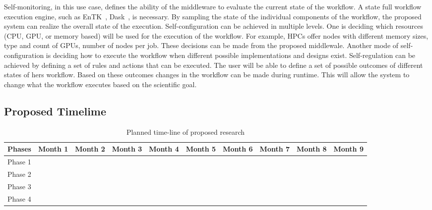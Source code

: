 Self-monitoring, in this use case, defines the ability of the middleware to evaluate the current state of the workflow. A state full workflow execution engine, such as EnTK~\cite{balasubramanian2018harnessing}, Dask~\cite{rocklin2015dask}, is necessary. By sampling the state of the individual components of the workflow, the proposed system can realize the overall state of the execution. Self-configuration can be achieved in multiple levels. One is deciding which resources (CPU, GPU, or memory based) will be used for the execution of the workflow. For example, HPCs offer nodes with different memory sizes, type and count of GPUs, number of nodes per job. These decisions can be made from the proposed middlewale. Another mode of self-configuration is deciding how to execute the workflow when different possible implementations and designs exist.  Self-regulation can be achieved by defining a set of rules and actions that can be executed. The user will be able to define a set of possible outcomes of different states of hers workflow. Based on these outcomes changes in the workflow can be made during runtime. This will allow the system to change what the workflow executes based on the scientific goal.

\subsection{Proposed Timelime}
\begin{table*}
	\centering
	\begin{tabular}{ |p{1.25cm}|p{1.25cm} p{1.25cm} p{1.25cm} p{1.25cm} p{1.25cm} p{1.25cm} p{1.25cm} p{1.25cm} p{1.25cm}|}
		\hline
		Phases  & Month 1 & Month 2 & Month 3 & Month 4 & Month 5 & Month 6 & Month 7 & Month 8 & Month 9 \\\hline\hline
		Phase 1 &         &         &         &         &         &         &         &         &         \\\hline
		Phase 2 &         &         &         &         &         &         &         &         &         \\\hline
		Phase 3 &         &         &         &         &         &         &         &         &         \\\hline
		Phase 4 &         &         &         &         &         &         &         &         &         \\\hline
	\end{tabular}
\caption{Planned time-line of proposed research}\label{tab:work_plan}
\end{table*}


